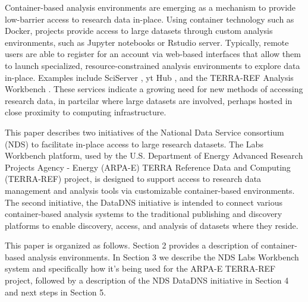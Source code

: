 \documentclass{sig-alternate}
\begin{document}
Container-based analysis environments are emerging as a mechanism to provide low-barrier access to research data in-place.  Using container technology such as Docker, projects provide access to large datasets through custom analysis environments, such as Jupyter notebooks or Rstudio server.  Typically, remote users are able to register for an account via web-based interfaces that allow them to launch specialized, resource-constrained analysis environments to explore data in-place. Examples include SciServer \cite{Medvedev:2016:SCB:2949689.2949700}, yt Hub \cite{zuhone2016galaxy}, and the TERRA-REF Analysis Workbench \cite{willis_craig_2017_580057}.  These services indicate a growing need for new methods of accessing research data, in partcilar where large datasets are involved, perhaps hosted in close proximity to computing infrastructure.

This paper describes two initiatives of the National Data Service consortium (NDS) to facilitate in-place access to large research datasets. The Labs Workbench platform, used by the U.S. Department of Energy Advanced Research Projects Agency - Energy (ARPA-E) TERRA Reference Data and Computing (TERRA-REF) project, is designed to support access to research data management and analysis tools via customizable container-based environments.  The second initiative, the DataDNS initiative is intended to connect various container-based analysis systems to the traditional publishing and discovery platforms to enable discovery, access, and analysis of datasets where they reside.



This paper is organized as follows.  Section 2 provides a description of container-based analysis environments.  In Section 3 we describe the NDS Labs Workbench system and specifically how it's being used for the ARPA-E TERRA-REF project, followed by a description of the NDS DataDNS initiative in Section 4 and next steps in Section 5.

\end{document}
